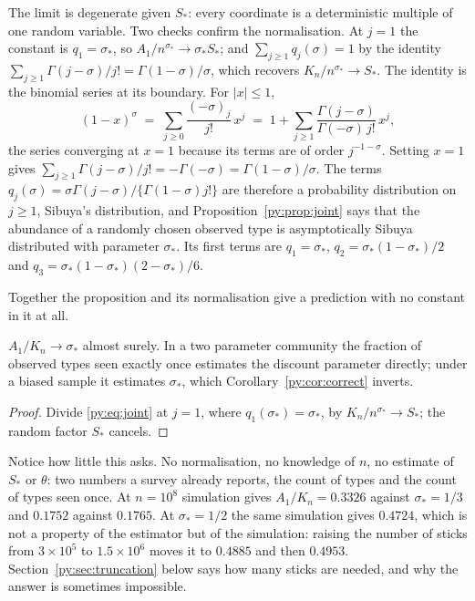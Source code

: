 The limit is degenerate given $S_*$: every coordinate is a deterministic multiple of one random
variable. Two checks confirm the normalisation. At $j = 1$ the constant is $q_1 = \sigma_*$, so
$A_1/n^{\sigma_*} \to \sigma_* S_*$; and $\sum_{j\ge1}q_j(\sigma) = 1$ by the identity
$\sum_{j\ge1}\Gamma(j-\sigma)/j! = \Gamma(1-\sigma)/\sigma$, which recovers
$K_n/n^{\sigma_*} \to S_*$. The identity is the binomial series at its boundary. For $|x| \le 1$,
\[
(1-x)^{\sigma} \;=\; \sum_{j\ge0}\frac{(-\sigma)_j}{j!}\,x^{j}
\;=\; 1 + \sum_{j\ge1}\frac{\Gamma(j-\sigma)}{\Gamma(-\sigma)\,j!}\,x^{j},
\]
the series converging at $x = 1$ because its terms are of order $j^{-1-\sigma}$. Setting $x = 1$ gives
$\sum_{j\ge1}\Gamma(j-\sigma)/j! = -\Gamma(-\sigma) = \Gamma(1-\sigma)/\sigma$. The terms
$q_j(\sigma) = \sigma\Gamma(j-\sigma)/\{\Gamma(1-\sigma)j!\}$ are therefore a probability
distribution on $j \ge 1$, Sibuya's distribution, and Proposition~\ref{py:prop:joint} says that
the abundance of a randomly chosen observed type is asymptotically Sibuya distributed with
parameter $\sigma_*$. Its first terms are $q_1 = \sigma_*$, $q_2 = \sigma_*(1-\sigma_*)/2$ and
$q_3 = \sigma_*(1-\sigma_*)(2-\sigma_*)/6$.

Together the proposition and its normalisation give a prediction with no constant in it at all.

\begin{corollary}
\label{py:cor:singleton}
$A_1/K_n \to \sigma_*$ almost surely. In a two parameter community the fraction of observed types
seen exactly once estimates the discount parameter directly; under a biased sample it estimates
$\sigma_*$, which Corollary~\ref{py:cor:correct} inverts.
\end{corollary}

\begin{proof}
Divide \eqref{py:eq:joint} at $j=1$, where $q_1(\sigma_*) = \sigma_*$, by
$K_n/n^{\sigma_*} \to S_*$; the random factor $S_*$ cancels.
\end{proof}

Notice how little this asks. No normalisation, no knowledge of $n$, no estimate of
$S_*$ or $\theta$: two numbers a survey already reports, the count of types and the count of types
seen once. At $n = 10^{8}$ simulation gives $A_1/K_n = 0.3326$ against $\sigma_* = 1/3$ and $0.1752$ against
$0.1765$. At $\sigma_* = 1/2$ the same simulation gives $0.4724$, which is not a property of the
estimator but of the simulation: raising the number of sticks from $3\times10^{5}$ to
$1.5\times10^{6}$ moves it to $0.4885$ and then $0.4953$. Section~\ref{py:sec:truncation} below says how many sticks are
needed, and why the answer is sometimes impossible.

